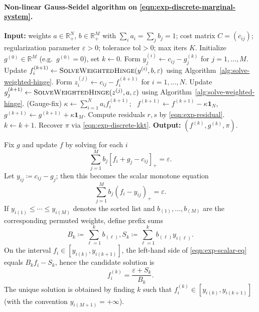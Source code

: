 \documentclass{article}
\theoremstyle{plain}
\theoremstyle{definition}
\theoremstyle{remark}
\numberwithin{equation}{section}
\newcommand{\R}{\mathbb{R}}
\begin{document}
\paragraph{Non-linear Gauss-Seidel algorithm on \eqref{eqn:exp-discrete-marginal-system}.}
\begin{algorithm}[ht]
\caption{Non-linear Gauss-Seidel (\citep[Alg.~1]{lorenz2021quadratically})}\label{alg:nlgs-qot}
\begin{algorithmic}[1]
\STATE \textbf{Input:} weights $a\in\R_+^N$, $b\in\R_+^M$ with $\sum_ia_i=\sum_jb_j=1$; cost matrix $C=(c_{ij})$; regularization parameter $\varepsilon>0$; tolerance $\mathrm{tol}>0$; max iters $K$.
\STATE Initialize $g^{(0)}\in\R^M$ (e.g.\ $g^{(0)}=0$), set $k\gets0$.
\REPEAT
{}
\STATE Form $y^{(i)}_j\gets c_{ij}-g_j^{(k)}$ for $j=1,\dots,M$.
\STATE Update $f_i^{(k+1)}\gets \textsc{SolveWeightedHinge}(y^{(i)},b,\varepsilon)$ using Algorithm~\ref{alg:solve-weighted-hinge}.
\ENDFOR
{}
\STATE Form $z^{(j)}_i\gets c_{ij}-f_i^{(k+1)}$ for $i=1,\dots,N$.
\STATE Update $g_j^{(k+1)}\gets \textsc{SolveWeightedHinge}(z^{(j)},a,\varepsilon)$ using Algorithm~\ref{alg:solve-weighted-hinge}.
\ENDFOR
\STATE (Gauge-fix) $\kappa\gets\sum_{i=1}^N a_i f_i^{(k+1)}$;
\ $f^{(k+1)}\gets f^{(k+1)}-\kappa\mathbf1_N$, $g^{(k+1)}\gets g^{(k+1)}+\kappa\mathbf1_M$.
\STATE Compute residuals $r,s$ by \eqref{eqn:exp-residual}.
\STATE $k\gets k+1$.
\STATE Recover $\pi$ via \eqref{eqn:exp-discrete-kkt}.
\STATE \textbf{Output:} $(f^{(k)},g^{(k)},\pi)$.
\end{algorithmic}
\end{algorithm}
Fix $g$ and update $f$ by solving for each $i$
\[
\sum_{j=1}^Mb_j[f_i+g_j-c_{ij}]_+=\varepsilon.
\]
Let $y_{ij}\coloneqq c_{ij}-g_j$; then this becomes the scalar monotone equation
\begin{equation}\label{eqn:exp-scalar-eq}
\sum_{j=1}^Mb_j(f_i-y_{ij})_+=\varepsilon.
\end{equation}
If $y_{i(1)}\le\cdots\le y_{i(M)}$ denotes the sorted list and $b_{(1)},\dots,b_{(M)}$ are the corresponding permuted weights, define prefix sums
$$
B_k\coloneqq\sum_{\ell=1}^k b_{(\ell)},S_k\coloneqq\sum_{\ell=1}^k b_{(\ell)}y_{i(\ell)}.
$$
On the interval $f_i\in[y_{i(k)},y_{i(k+1)}]$, the left-hand side of \eqref{eqn:exp-scalar-eq} equals $B_kf_i-S_k$, hence the candidate solution is
\[
f_i^{(k)}=\frac{\varepsilon+S_k}{B_k}.
\]
The unique solution is obtained by finding $k$ such that $f_i^{(k)}\in[y_{i(k)},y_{i(k+1)}]$ (with the convention $y_{i(M+1)}=+\infty$).
\end{document}
